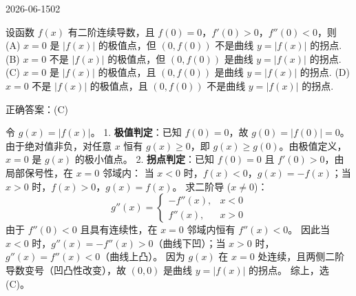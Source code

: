 \begin{mistake}{2026-06-15}{02}

\begin{problemcontent}
设函数 \(f(x)\) 有二阶连续导数，且 \(f(0)=0\)，\(f'(0)>0\)，\(f''(0)<0\)，则
(A) \(x=0\) 是 \(|f(x)|\) 的极值点，但 \((0,f(0))\) 不是曲线 \(y=|f(x)|\) 的拐点.
(B) \(x=0\) 不是 \(|f(x)|\) 的极值点，但 \((0,f(0))\) 是曲线 \(y=|f(x)|\) 的拐点.
(C) \(x=0\) 是 \(|f(x)|\) 的极值点，且 \((0,f(0))\) 是曲线 \(y=|f(x)|\) 的拐点.
(D) \(x=0\) 不是 \(|f(x)|\) 的极值点，且 \((0,f(0))\) 不是曲线 \(y=|f(x)|\) 的拐点.
\end{problemcontent}

\begin{solutioncontent}
正确答案：(C)

令 \(g(x) = |f(x)|\)。
1. \textbf{极值判定}：已知 \(f(0)=0\)，故 \(g(0) = |f(0)| = 0\)。由于绝对值非负，对任意 \(x\) 恒有 \(g(x) \ge 0\)，即 \(g(x) \ge g(0)\)。由极值定义，\(x=0\) 是 \(g(x)\) 的极小值点。
2. \textbf{拐点判定}：已知 \(f(0)=0\) 且 \(f'(0)>0\)，由局部保号性，在 \(x=0\) 邻域内：
当 \(x<0\) 时，\(f(x)<0\)，\(g(x)=-f(x)\)；当 \(x>0\) 时，\(f(x)>0\)，\(g(x)=f(x)\)。
求二阶导 (\(x \neq 0\))：
\[
g''(x) = \begin{cases} 
-f''(x), & x < 0 \\ 
f''(x), & x > 0 
\end{cases}
\]
由于 \(f''(0)<0\) 且具有连续性，在 \(x=0\) 邻域内恒有 \(f''(x)<0\)。
因此当 \(x<0\) 时，\(g''(x)=-f''(x)>0\)（曲线下凹）；当 \(x>0\) 时，\(g''(x)=f''(x)<0\)（曲线上凸）。
因为 \(g(x)\) 在 \(x=0\) 处连续，且两侧二阶导数变号（凹凸性改变），故 \((0,0)\) 是曲线 \(y=|f(x)|\) 的拐点。
综上，选 (C)。
\end{solutioncontent}


\end{mistake}
